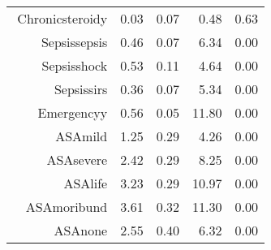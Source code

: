 \begin{tabular}{rrrrr}
$$  Chronic\-steroid\-y & 0.03 & 0.07 & 0.48 & 0.63 \\ 
  Sepsis\-sepsis & 0.46 & 0.07 & 6.34 & 0.00 \\ 
  Sepsis\-shock & 0.53 & 0.11 & 4.64 & 0.00 \\ 
  Sepsis\-sirs & 0.36 & 0.07 & 5.34 & 0.00 \\ 
  Emergency\-y & 0.56 & 0.05 & 11.80 & 0.00 \\ 
  ASA\-mild & 1.25 & 0.29 & 4.26 & 0.00 \\ 
  ASA\-severe & 2.42 & 0.29 & 8.25 & 0.00 \\ 
  ASA\-life & 3.23 & 0.29 & 10.97 & 0.00 \\ 
  ASA\-moribund & 3.61 & 0.32 & 11.30 & 0.00 \\ 
  ASA\-none & 2.55 & 0.40 & 6.32 & 0.00 \\ 
   \hline
\end{tabular}

